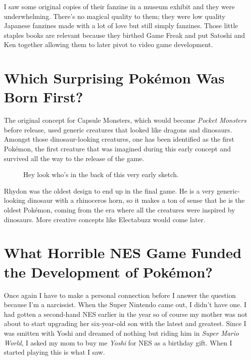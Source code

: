 \documentclass{book}
\begin{document}
\FloatBarrier\vspace{\baselineskip}\begin{figure}[H]\end{figure}
I saw some original copies of their fanzine in a museum exhibit and they were underwhelming. There’s no magical quality to them; they were low quality Japanese fanzines made with a lot of love but still simply fanzines. Those little staples books are relevant because they birthed Game Freak and put Satoshi and Ken together allowing them to later pivot to video game development.\par
\FloatBarrier\section*{Which Surprising Pokémon Was Born First?}
The original concept for Capsule Monsters, which would become \emph{Pocket Monsters} before release, used generic creatures that looked like dragons and dinosaurs. Amongst those dinosaur-looking creatures, one has been identified as the first Pokémon, the first creature that was imagined during this early concept and survived all the way to the release of the game.\par
\FloatBarrier\vspace{\baselineskip}\begin{figure}[H]\caption*{Hey look who’s in the back of this very early sketch.}\end{figure}
Rhydon was the oldest design to end up in the final game. He is a very generic-looking dinosaur with a rhinoceros horn, so it makes a ton of sense that he is the oldest Pokémon, coming from the era where all the creatures were inspired by dinosaurs. More creative concepts like Electabuzz would come later.\par
\FloatBarrier\section*{What Horrible NES Game Funded the Development of Pokémon?}
Once again I have to make a personal connection before I answer the question because I’m a narcissist. When the Super Nintendo came out, I didn’t have one. I had gotten a second-hand NES earlier in the year so of course my mother was not about to start upgrading her six-year-old son with the latest and greatest. Since I was smitten with Yoshi and dreamed of nothing but riding him in \emph{Super Mario World}, I asked my mom to buy me \emph{Yoshi} for NES as a birthday gift. When I started playing this is what I saw.\par
\end{document}
